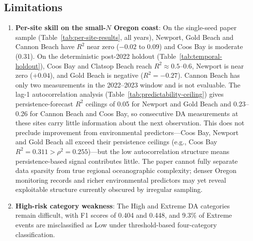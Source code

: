 \documentclass[toxins,article,submit,moreauthors]{Definitions/mdpi}
\begin{document}
\subsection{Limitations}
\label{sec:discussion-limitations}

\begin{enumerate}[nosep]
    \item \textbf{Per-site skill on the small-$N$ Oregon coast}: On the single-seed paper sample (Table~\ref{tab:per-site-results}, all years), Newport, Gold Beach and Cannon Beach have $R^2$ near zero ($-0.02$ to $0.09$) and Coos Bay is moderate (0.31). On the deterministic post-2022 holdout (Table~\ref{tab:temporal-holdout}), Coos Bay and Clatsop Beach reach $R^2 \approx 0.5$--$0.6$, Newport is near zero ($+0.04$), and Gold Beach is negative ($R^2 = -0.27$). Cannon Beach has only two measurements in the 2022--2023 window and is not evaluable. The lag-1 autocorrelation analysis (Table~\ref{tab:predictability-ceiling}) gives persistence-forecast $R^2$ ceilings of 0.05 for Newport and Gold Beach and 0.23--0.26 for Cannon Beach and Coos Bay, so consecutive DA measurements at these sites carry little information about the next observation. This does not preclude improvement from environmental predictors---Coos Bay, Newport and Gold Beach all exceed their persistence ceilings (e.g., Coos Bay $R^2 = 0.311 > \rho^2 = 0.255$)---but the low autocorrelation structure means persistence-based signal contributes little. The paper cannot fully separate data sparsity from true regional oceanographic complexity; denser Oregon monitoring records and richer environmental predictors may yet reveal exploitable structure currently obscured by irregular sampling.
    \item \textbf{High-risk category weakness}: The High and Extreme DA categories remain difficult, with F1 scores of 0.404 and 0.448, and 9.3\% of Extreme events are misclassified as Low under threshold-based four-category classification.

\end{enumerate}
\end{document}
